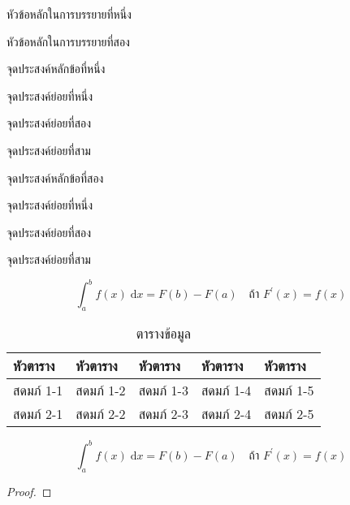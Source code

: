 \begin{preview}
	\item หัวข้อหลักในการบรรยายที่หนึ่ง
	\item หัวข้อหลักในการบรรยายที่สอง
\end{preview}
\begin{objective}
\item จุดประสงค์หลักข้อที่หนึ่ง
		\begin{subobjective}
			\item จุดประสงค์ย่อยที่หนึ่ง
			\item จุดประสงค์ย่อยที่สอง
			\item จุดประสงค์ย่อยที่สาม
		\end{subobjective}
\item จุดประสงค์หลักข้อที่สอง
		\begin{subobjective}
			\item จุดประสงค์ย่อยที่หนึ่ง
			\item จุดประสงค์ย่อยที่สอง
			\item จุดประสงค์ย่อยที่สาม
		\end{subobjective}
\end{objective}
\begin{content}
\begin{equation}
	\int_{a}^{b} f(x) \;\mathrm{d}x = F(b) - F(a) \quad\text{ถ้า }F^\prime(x) = f(x)
\end{equation}

\begin{table}[h]
\centering
\begin{tabular}{|l|l|l|l|l|}
\hline
หัวตาราง & หัวตาราง & หัวตาราง & หัวตาราง & หัวตาราง \\ \hline
สดมภ์ 1-1 & สดมภ์ 1-2 & สดมภ์ 1-3 & สดมภ์ 1-4 & สดมภ์ 1-5  \\ \hline
สดมภ์ 2-1 & สดมภ์ 2-2 & สดมภ์ 2-3 & สดมภ์ 2-4 & สดมภ์ 2-5  \\ \hline
\end{tabular}
\caption{ตารางข้อมูล}
\end{table}

\begin{theorem}
\begin{equation}
	\int_{a}^{b} f(x) \;\mathrm{d}x = F(b) - F(a) \quad\text{ถ้า }F^\prime(x) = f(x)
\end{equation}
\end{theorem}
\begin{proof}
\end{proof}

\begin{example}
\end{example}

\end{content}

